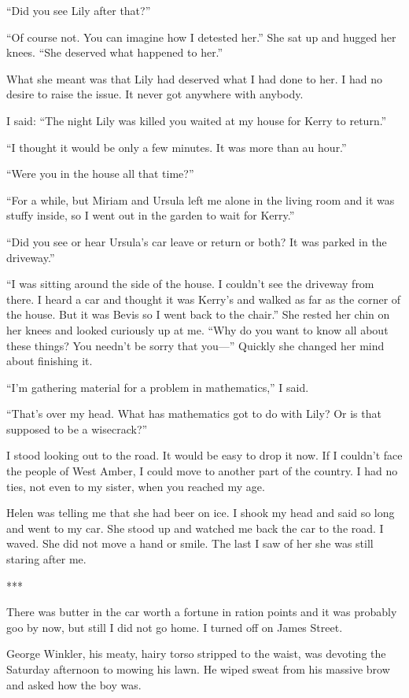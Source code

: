 {“Did you see Lily after that?”

“Of course not. You can imagine how I detested her.” She sat up and hugged her knees. “She deserved what happened to her.”

What she meant was that Lily had deserved what I had done to her. I had no desire to raise the issue. It never got anywhere with anybody.

I said: “The night Lily was killed you waited at my house for Kerry to return.”

“I thought it would be only a few minutes. It was more than au hour.”

“Were you in the house all that time?”

“For a while, but Miriam and Ursula left me alone in the living room and it was stuffy inside, so I went out in the garden to wait for Kerry.”

“Did you see or hear Ursula’s car leave or return or both? It was parked in the driveway.”

“I was sitting around the side of the house. I couldn’t see the driveway from there. I heard a car and thought it was Kerry’s and walked as far as the corner of the house. But it was Bevis so I went back to the chair.” She rested her chin on her knees and looked curiously up at me. “Why do you want to know all about these things? You needn’t be sorry that you—” Quickly she changed her mind about finishing it.

“I’m gathering material for a problem in mathematics,” I said.

“That’s over my head. What has mathematics got to do with Lily? Or is that supposed to be a wisecrack?”

I stood looking out to the road. It would be easy to drop it now. If I couldn’t face the people of West Amber, I could move to another part of the country. I had no ties, not even to my sister, when you reached my age.

Helen was telling me that she had beer on ice. I shook my head and said so long and went to my car. She stood up and watched me back the car to the road. I waved. She did not move a hand or smile. The last I saw of her she was still staring after me.

***

There was butter in the car worth a fortune in ration points and it was probably goo by now, but still I did not go home. I turned off on James Street.

George Winkler, his meaty, hairy torso stripped to the waist, was devoting the Saturday afternoon to mowing his lawn. He wiped sweat from his massive brow and asked how the boy was.

}

